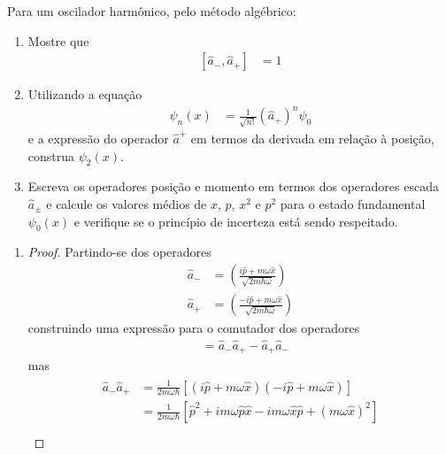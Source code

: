 \begin{prob}
	Para um oscilador harmônico, pelo método algébrico:
	\begin{enumerate}[label=\alph *)]
		\item Mostre que
			\begin{align}
				\left[\hat{a}_{-},\hat{a}_{+}\right] &= 1
			\end{align}
		\item Utilizando a equação
			\begin{align}
				\psi_n(x) &= \frac{1}{\sqrt{n!}}\left(\hat{a}_{+}\right)^{n}\psi_{0}
			\end{align}
			e a expressão do operador $\hat{a}^{+}$ em termos da derivada em relação à posição, construa $\psi_{2}(x)$.
		\item Escreva os operadores posição e momento em termos dos operadores escada $\hat{a}_{\pm}$ e calcule os valores médios de $x$, $p$, $x^{2}$ e $p^{2}$ para o estado fundamental $\psi_{0}(x)$ e verifique se o princípio de incerteza está sendo respeitado.
	\end{enumerate}
	\begin{sol}
		\begin{enumerate}[label=\alph *)]
			\item 
				\begin{proof}
					Partindo-se dos operadores
					\begin{subequations}
						\begin{align}
							\hat{a}_{-} &= \left(\frac{i \hat{p}+m \omega \hat{x}}{\sqrt{2m \hbar \omega}}\right)\\
							\hat{a}_{+} &= \left(\frac{-i \hat{p}+m \omega \hat{x}}{\sqrt{2m \hbar \omega}}\right)
						\end{align}
					\end{subequations}
					construindo uma expressão para o comutador dos operadores
					\begin{align}
						[\hat{a}_{-},\hat{a}_{+}] &=	\hat{a}_{-}\hat{a}_{+}-\hat{a}_{+}\hat{a}_{-}
					\end{align} 
					mas
					\begin{align}
						\begin{split}
							\hat{a}_{-}\hat{a}_{+} &= \frac{1}{2m \omega \hbar}\left[(i \hat{p}+m \omega \hat{x})(-i \hat{p}+m \omega \hat{x})\right]\\
																		 &= \frac{1}{2m \omega \hbar}\left[\hat{p}^{2}+im \omega \hat{p}\hat{x}-im \omega \hat{x}\hat{p}+(m \omega \hat{x})^{2}\right]\\

\end{split}
\end{align}
\end{proof}
\end{enumerate}
\end{sol}
\end{prob}
